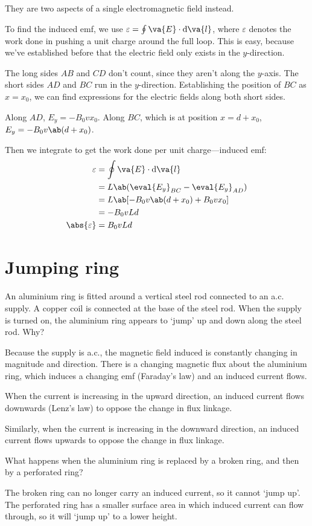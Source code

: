 They are two aspects of a single electromagnetic field instead.

To find the induced emf, we use \(\varepsilon = \oint\va{E}\cdot\odif{\va{l}}\),
where \(\varepsilon\) denotes the work done in pushing a unit charge around
the full loop. This is easy, because we've established before that the electric field
only exists in the \(y\)-direction.

The long sides \(AB\) and \(CD\) don't count, since they aren't along the \(y\)-axis.
The short sides \(AD\) and \(BC\) run in the \(y\)-direction. Establishing the position
of \(BC\) as \(x = x_0\), we can find expressions for the electric fields along both short sides.

Along \(AD\), \(E_y = -B_0vx_0\). Along \(BC\), which is at position \(x = d + x_0\),
\(E_y = -B_0v\ab(d+x_0)\).

Then we integrate to get the work done per unit charge---induced emf:
\begin{align*}
	\varepsilon       & = \oint\va{E}\cdot\odif{\va{l}}           \\
	                  & = L\ab(\eval{E_y}_{BC} - \eval{E_y}_{AD}) \\
	                  & = L\ab[-B_0v\ab(d+x_0) + B_0vx_0]         \\
	                  & = -B_0vLd                                 \\
	\abs{\varepsilon} & = B_0vLd
\end{align*}


\section{Jumping ring}
\begin{problem}
An aluminium ring is fitted around a vertical steel rod connected to an a.c.
supply. A copper coil is connected at the base of the steel rod.
When the supply is turned on, the aluminium ring appears to `jump'
up and down along the steel rod. Why?
\end{problem}
Because the supply is a.c., the magnetic field induced
is constantly changing in magnitude and direction. There is a
changing magnetic flux about the aluminium ring, which induces a
changing emf (Faraday's law) and an induced current flows.

When the current is increasing in the upward direction, an
induced current flows downwards (Lenz's law) to oppose the change in flux linkage.

Similarly, when the current is increasing in the downward direction, an
induced current flows upwards to oppose the change in flux linkage.

\begin{problem}
What happens when the aluminium ring is replaced by a broken ring,
and then by a perforated ring?
\end{problem}
The broken ring can no longer carry an induced current, so it
cannot `jump up'. The perforated ring has a smaller surface
area in which induced current can flow through, so it will `jump up'
to a lower height.
